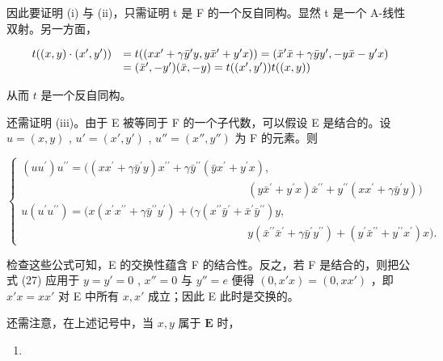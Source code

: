 因此要证明 (i) 与 (ii)，只需证明 t 是 F 的一个反自同构。显然 t 是一个 A-线性双射。另一方面，

\[
\begin{array}{r l} t ((x, y) \cdot (x ^ {\prime}, y ^ {\prime})) & = t ((x x ^ {\prime} + \gamma \bar {y} ^ {\prime} y, y \bar {x} ^ {\prime} + y ^ {\prime} x)) = (\bar {x} ^ {\prime} \bar {x} + \gamma \bar {y} y ^ {\prime}, - y \bar {x} - y ^ {\prime} x) \\ & = (\bar {x} ^ {\prime}, - y ^ {\prime}) (\bar {x}, - y) = t ((x ^ {\prime}, y ^ {\prime})) t ((x, y)) \end{array}
\]

从而 \(t\) 是一个反自同构。

还需证明 (iii)。由于 E 被等同于 F 的一个子代数，可以假设 E 是结合的。设 \(u = (x, y)\) , \(u' = (x', y')\) , \(u'' = (x'', y'')\) 为 F 的元素。则

\[
\left\{ \begin{array}{l} (u u ^ {\prime}) u ^ {\prime \prime} = ((x x ^ {\prime} + \gamma \bar {y} ^ {\prime} y) x ^ {\prime \prime} + \gamma \bar {y} ^ {\prime \prime} (\bar {y} x ^ {\prime} + y ^ {\prime} x), \\ \qquad \qquad \qquad \qquad \qquad \qquad \qquad \qquad \qquad \qquad (y \bar {x} ^ {\prime} + y ^ {\prime} x) \bar {x} ^ {\prime \prime} + y ^ {\prime \prime} (x x ^ {\prime} + \gamma \bar {y} ^ {\prime} y)) \\ u (u ^ {\prime} u ^ {\prime \prime}) = (x (x ^ {\prime} x ^ {\prime \prime} + \gamma \bar {y} ^ {\prime \prime} y ^ {\prime}) + (\gamma (x ^ {\prime \prime} \bar {y} ^ {\prime} + \bar {x} ^ {\prime} \bar {y} ^ {\prime \prime}) y, \\ \qquad \qquad \qquad \qquad \qquad \qquad \qquad \qquad \qquad \qquad y (\bar {x} ^ {\prime \prime} \bar {x} ^ {\prime} + \gamma \bar {y} ^ {\prime} y ^ {\prime \prime}) + (y ^ {\prime} \bar {x} ^ {\prime \prime} + y ^ {\prime \prime} x ^ {\prime}) x). \end{array} \right.\tag{27}
\]

检查这些公式可知，E 的交换性蕴含 F 的结合性。反之，若 F 是结合的，则把公式 (27) 应用于 \(y = y' = 0\) , \(x'' = 0\) 与 \(y'' = e\) 便得 \((0, x'x) = (0, xx')\) ，即 \(x'x = xx'\) 对 E 中所有 \(x, x'\) 成立；因此 E 此时是交换的。

还需注意，在上述记号中，当 \(x, y\) 属于 \(\mathbf{E}\) 时，

\begin{enumerate}
\def\labelenumi{(\arabic{enumi})}
\setcounter{enumi}{27}
\tightlist
\item
\end{enumerate}

